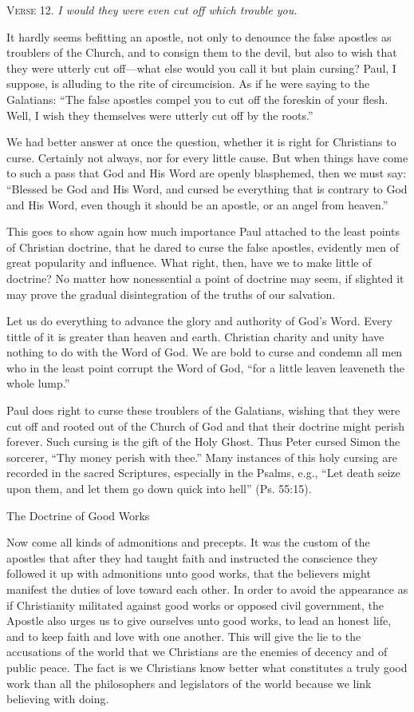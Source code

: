 \textsc{Verse} 12. \emph{I would they were even cut off which trouble you.}

It hardly seems befitting an apostle, not only to denounce the false apostles as troublers of the Church, and to consign them to the devil, but also to wish that they were utterly cut off—what else would you call it but plain cursing? Paul, I suppose, is alluding to the rite of circumcision. As if he were saying to the Galatians: “The false apostles compel you to cut off the foreskin of your flesh. Well, I wish they themselves were utterly cut off by the roots.”

We had better answer at once the question, whether it is right for Christians to curse. Certainly not always, nor for every little cause. But when things have come to such a pass that God and His Word are openly blasphemed, then we must say: “Blessed be God and His Word, and cursed be everything that is contrary to God and His Word, even though it should be an apostle, or an angel from heaven.”

This goes to show again how much importance Paul attached to the least points of Christian doctrine, that he dared to curse the false apostles, evidently men of great popularity and influence. What right, then, have we to make little of doctrine? No matter how nonessential a point of doctrine may seem, if slighted it may prove the gradual disintegration of the truths of our salvation.

Let us do everything to advance the glory and authority of God’s Word. Every tittle of it is greater than heaven and earth. Christian charity and unity have nothing to do with the Word of God. We are bold to curse and condemn all men who in the least point corrupt the Word of God, “for a little leaven leaveneth the whole lump.”

Paul does right to curse these troublers of the Galatians, wishing that they were cut off and rooted out of the Church of God and that their doctrine might perish forever. Such cursing is the gift of the Holy Ghost. Thus Peter cursed Simon the sorcerer, “Thy money perish with thee.” Many instances of this holy cursing are recorded in the sacred Scriptures, especially in the Psalms, e.g., “Let death seize upon them, and let them go down quick into hell” (Ps. 55:15).

The Doctrine of Good Works

Now come all kinds of admonitions and precepts. It was the custom of the apostles that after they had taught faith and instructed the conscience they followed it up with admonitions unto good works, that the believers might manifest the duties of love toward each other. In order to avoid the appearance as if Christianity militated against good works or opposed civil government, the Apostle also urges us to give ourselves unto good works, to lead an honest life, and to keep faith and love with one another. This will give the lie to the accusations of the world that we Christians are the enemies of decency and of public peace. The fact is we Christians know better what constitutes a truly good work than all the philosophers and legislators of the world because we link believing with doing.

